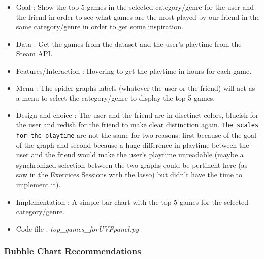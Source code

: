 \documentclass{article}
\begin{document}
	\begin{itemize}
		\item Goal : Show the top 5 games in the selected category/genre for the user and the friend in order to see what games are the most played by our friend in the same category/genre in order to get some inspiration.
		\item Data : Get the games from the dataset and the user's playtime from the Steam API.
		\item Features/Interaction : Hovering to get the playtime in hours for each game.
		\item Menu : The spider graphs labels (whatever the user or the friend) will act as a menu to select the category/genre to display the top 5 games.
		\item Design and choice : The user and the friend are in disctinct colors, blueish for the user and redish for the friend to make clear distinction again. \texttt{The scales for the playtime} are not the same for two reasons: first because of the goal of the graph and second because a huge difference in playtime between the user and the friend would make the user's playtime unreadable (maybe a synchronized selection between the two graphs could be pertinent here (as saw in the Exercices Sessions with the lasso) but didn't have the time to implement it).
		\item Implementation : A simple bar chart with the top 5 games for the selected category/genre.
		\item Code file : \textit{top\_games\_forUVFpanel.py}
	\end{itemize}
	
	\subsubsection{Bubble Chart Recommendations}
	
\end{document}
